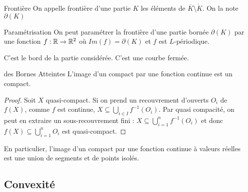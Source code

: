 \documentclass{cours}
\begin{document}
\begin{définition}{Frontière}{}
On appelle frontière d'une partie $K$ les éléments de $\overline{K} \setminus \mathring{K}$. On la note $\partial(K)$
\end{définition}

\begin{propositionfr}{Paramétrisation}{}
    On peut paramétrer la frontière d'une partie bornée $\partial(K)$ par une fonction $f : \mathbb{R} \to \mathbb{R}^{2}$ où $Im(f) = \partial(K)$ et $f$ est $L$-périodique.
\end{propositionfr}
C'est le bord de la partie considérée. C'est une courbe fermée.

\begin{théorème}{des Bornes Atteintes}{}
L'image d'un compact par une fonction continue est un compact.
\end{théorème}
\begin{proof}
    Soit $X$ quasi-compact. Si on prend un recouvrement d'ouverts $O_{i}$ de $f(X)$, comme $f$ est continue, $X \subseteq\bigcup_{i \in I} f^{-1}(O_{i})$. Par quasi compacité, on peut en extraire un sous-recouvrement fini : $X \subseteq \bigcup_{i = 1}^{n} f^{-1}(O_{i})$ et donc $f(X) \subseteq \bigcup_{i = 1}^{n} O_{i}$ est quasi-compact.
\end{proof}
En particulier, l'image d'un compact par une fonction continue à valeurs réelles est une union de segments et de points isolés.

\subsection{Convexité}
\end{document}

